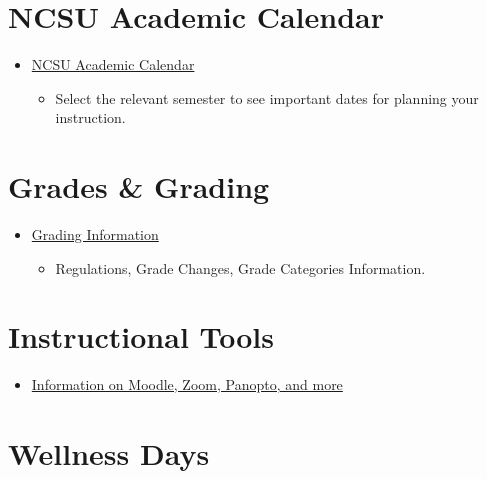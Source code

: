 \documentclass[
]{book}
\providecommand{\tightlist}{%
  \setlength{\itemsep}{0pt}\setlength{\parskip}{0pt}}
\begin{document}
\hypertarget{ncsu-academic-calendar}{%
\section{NCSU Academic Calendar}\label{ncsu-academic-calendar}}

\begin{itemize}
\tightlist
\item
  \href{https://studentservices.ncsu.edu/calendars/academic/}{NCSU Academic Calendar}

  \begin{itemize}
  \tightlist
  \item
    Select the relevant semester to see important dates for planning your instruction.
  \end{itemize}
\end{itemize}

\hypertarget{grades-grading}{%
\section{Grades \& Grading}\label{grades-grading}}

\begin{itemize}
\tightlist
\item
  \href{https://registrar.ncsu.edu/facultygradinginfo/}{Grading Information}

  \begin{itemize}
  \tightlist
  \item
    Regulations, Grade Changes, Grade Categories Information.
  \end{itemize}
\end{itemize}

\hypertarget{instructional-tools}{%
\section{Instructional Tools}\label{instructional-tools}}

\begin{itemize}
\tightlist
\item
  \href{https://delta.ncsu.edu/learning-technology/instructional-tools/}{Information on Moodle, Zoom, Panopto, and more}
\end{itemize}

\hypertarget{wellness-days}{%
\section{Wellness Days}\label{wellness-days}}
\end{document}
